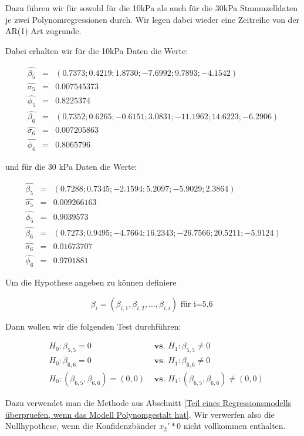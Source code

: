 \documentclass[12pt,a4paper]{article}
\theoremstyle{definition}
\theoremstyle{definition}
\theoremstyle{definition}
\theoremstyle{definition}
\begin{document}
Dazu führen wir für sowohl für die 10kPa als auch für die 30kPa Stammzelldaten je zwei Polynomregressionen durch. Wir legen dabei wieder eine Zeitreihe von der AR(1) Art zugrunde.

Dabei erhalten wir für die 10kPa Daten die Werte:

\begin{eqnarray*}
\hat{\beta_{5}} &=&  (0.7373 ; 0.4219 ; 1.8730 ; -7.6992 ; 9.7893 ; -4.1542)  \\
\hat{\sigma_{5}} &=& 0.007545373 \\
\hat{\phi_{5}} &=& 0.8225374 \\
\hat{\beta_{6}} &=& (0.7352 ; 0.6265 ; -0.6151 ; 3.0831 ; -11.1962 ; 14.6223 ; -6.2906)  \\
\hat{\sigma_{6}} &=& 0.007205863 \\
\hat{\phi_{6}} &=& 0.8065796
\end{eqnarray*}

und für die 30 kPa Daten die Werte:

\begin{eqnarray*}
\hat{\beta_{5}} &=& (0.7288 ; 0.7345 ; -2.1594 ; 5.2097 ; -5.9029 ; 2.3864)  \\
\hat{\sigma_{5}} &=& 0.009266163 \\
\hat{\phi_{5}} &=& 0.9039573 \\
\hat{\beta_{6}} &=& (0.7273 ; 0.9495 ; -4.7664 ; 16.2343 ; -26.7566 ; 20.5211 ; -5.9124)  \\
\hat{\sigma_{6}} &=& 0.01673707 \\
\hat{\phi_{6}} &=& 0.9701881
\end{eqnarray*}

Um die Hypothese angeben zu können definiere 

\begin{equation*}
\beta_{i} = (\beta_{i,1}, \beta_{i,2}, \ldots, \beta_{i,i}) \text{ für i=5,6 }
\end{equation*}

Dann wollen wir die folgenden Test durchführen:

\begin{eqnarray*}
&H_0 : \beta_{5,5} = 0 &\textbf{ vs. } H_1 : \beta_{5,5} \neq 0 \\
&H_0 : \beta_{6,6} = 0 &\textbf{ vs. } H_1 : \beta_{6,6} \neq 0 \\
&H_0 : (\beta_{6,5}, \beta_{6,6}) = (0,0) &\textbf{ vs. } H_1 : (\beta_{6,5}, \beta_{6,6}) \neq (0,0)
\end{eqnarray*}

Dazu verwendet man die Methode aus Abschnitt \ref{Teil eines Regressionsmodells überpruefen, wenn das Modell Polynomgestalt hat}. Wir verwerfen also die Nullhypothese, wenn die Konfidenzbänder $x_2' * 0$ nicht vollkommen enthalten. 
\end{document}
